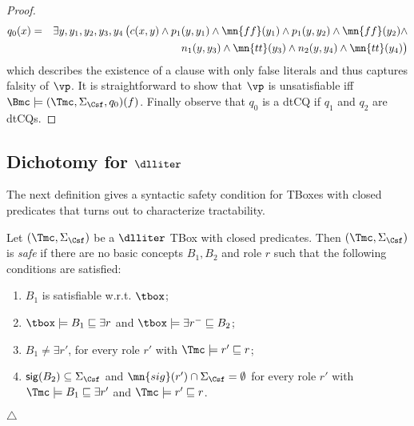 \documentclass{lmcs}
\theoremstyle{definition}
\begin{document}
\begin{proof}
   \begin{eqnarray*}
    q_0(x) &  = & \exists y, y_{1},y_{2},y_{3},y_{4}\,\big(c(x,y) \wedge p_{1}(y,y_{1}) \wedge \mn{ff}(y_{1})\wedge
                      p_{1}(y,y_{2}) \wedge \mn{ff}(y_{2})\wedge\\
           &&         \;\;\;\;\;   n_{1}(y,y_{3}) \wedge \mn{tt}(y_{3})\wedge
                         n_{2}(y,y_{4}) \wedge \mn{tt}(y_{4})\big)
   \end{eqnarray*}
  which describes the existence of a clause with only false literals 
  and thus captures falsity of $\vp$. It is straightforward to show that $\vp$ is 
  unsatisfiable iff $\Bmc \models (\Tmc,\Sigma_\Csf,q_0)(f)$. Finally observe that $q_{0}$ is a dtCQ
  if $q_{1}$ and $q_{2}$ are dtCQs.
\end{proof}

\subsection{Dichotomy for $\dlliter$}
% 
The next definition gives a syntactic safety condition for \dlliter
TBoxes with closed predicates that turns out to characterize tractability.
%
\begin{defi}
\label{def:safe_dllite_tbox}
  Let $(\Tmc,\Sigma_\Csf)$ be a $\dlliter$ TBox with closed predicates.
  Then $(\Tmc,\Sigma_\Csf)$ 
  is \emph{safe} if there are no basic concepts $B_{1},B_{2}$ and
  role $r$ such that the following conditions are satisfied:
  \begin{enumerate}
  \item $B_1$ is satisfiable w.r.t. $\tbox$;
  \item $\tbox\models B_1\sqsubseteq \exists r$ and
    $\tbox\models\exists r^{-}\sqsubseteq B_2$;
  \item $B_1\neq \exists r'$, for every role $r'$ with
    $\Tmc\models r'\sqsubseteq r$;
  \item ${\sf sig}(B_{2})\subseteq \Sigma_\Csf$ and $\mn{sig}(r') \cap
    \Sigma_\Csf = \emptyset$ for every role $r'$ with $\Tmc \models B_1
    \sqsubseteq \exists r'$ and $\Tmc\models r'\sqsubseteq r$.
  \end{enumerate}
  \hfill$\triangle$
\end{defi}
\end{document}
